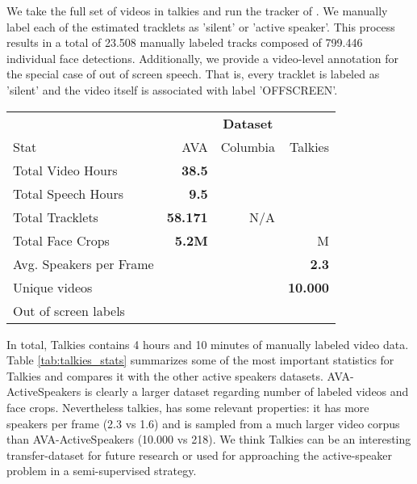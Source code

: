 \documentclass[10pt,twocolumn,letterpaper]{article}
\newcommand{\cmark}{\ding{51}}\newcommand{\xmark}{\ding{55}}
\begin{document}
We take the full set of videos in talkies and run the tracker of \cite{wojke2017simple}. We manually label each of the estimated tracklets as 'silent' or 'active speaker'. This process results in a total of 23.508 manually labeled tracks composed of 799.446 individual face detections. Additionally, we provide a video-level annotation for the special case of out of screen speech. That is, every tracklet is labeled as 'silent' and the video itself is associated with label 'OFFSCREEN'.

\begin{table*}[t]
    \small
    \centering
    \begin{tabular}{l r r r}

        \toprule
        & \multicolumn{3}{c}{\textbf{Dataset}} \\
        Stat & AVA \cite{roth2019ava} &  Columbia \cite{chakravarty2016active} & Talkies  \\
        \midrule
        Total Video Hours & \textbf{38.5} &  &  \\
        Total Speech Hours & \textbf{9.5} &  &  \\
        Total Tracklets & \textbf{58.171} & N/A &  \\
        Total Face Crops & \textbf{5.2M} &  & M \\
        Avg. Speakers per Frame &  &  & \textbf{2.3} \\
        Unique videos &  &  & \textbf{10.000} \\
        Out of screen labels & \xmark & \xmark & \cmark \\
        \toprule    
    
    \end{tabular}
    \caption{\textbf{Dataset Comparison.}  We compare some relevant statistics of the talkies dataset and the other 2 well know datasets for active speaker detection. While talkies is smaller than the Ava-Active speaker dataset it remains an interesting benchmark given its large video pool, diversity and large number of possible speakers.
    }
    \label{tab:talkies_stats}
\end{table*} 
In total, Talkies contains 4 hours and 10 minutes of manually labeled video data. Table \ref{tab:talkies_stats} summarizes some of the most important statistics for Talkies and compares it with the other active speakers datasets. AVA-ActiveSpeakers is clearly a larger dataset regarding number of labeled videos and face crops. Nevertheless talkies, has some relevant properties: it has more speakers per frame (2.3 vs 1.6) and is sampled from a much larger video corpus than AVA-ActiveSpeakers (10.000 vs 218). We think Talkies can be an interesting transfer-dataset for future research or used for approaching the active-speaker problem in a semi-supervised strategy.
\end{document}
